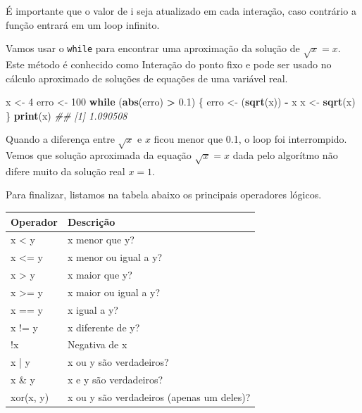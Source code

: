 \documentclass[]{book}
\newenvironment{Shaded}{\begin{snugshade}}{\end{snugshade}}
\newcommand{\CommentTok}[1]{\textcolor[rgb]{0.56,0.35,0.01}{\textit{#1}}}
\newcommand{\ControlFlowTok}[1]{\textcolor[rgb]{0.13,0.29,0.53}{\textbf{#1}}}
\newcommand{\DecValTok}[1]{\textcolor[rgb]{0.00,0.00,0.81}{#1}}
\newcommand{\FloatTok}[1]{\textcolor[rgb]{0.00,0.00,0.81}{#1}}
\newcommand{\KeywordTok}[1]{\textcolor[rgb]{0.13,0.29,0.53}{\textbf{#1}}}
\newcommand{\NormalTok}[1]{#1}
\newcommand{\OperatorTok}[1]{\textcolor[rgb]{0.81,0.36,0.00}{\textbf{#1}}}
\newcommand{\StringTok}[1]{\textcolor[rgb]{0.31,0.60,0.02}{#1}}
\begin{document}
É importante que o valor de i seja atualizado em cada interação, caso contrário a função entrará em um loop infinito.

Vamos usar o \texttt{while} para encontrar uma aproximação da solução de \(\sqrt{x} = x\). Este método é conhecido como Interação do ponto fixo e pode ser usado no cálculo aproximado de soluções de equações de uma variável real.

\begin{Shaded}
\begin{Highlighting}[]

\NormalTok{x <-}\StringTok{ }\DecValTok{4}
\NormalTok{erro <-}\StringTok{ }\DecValTok{100}
\ControlFlowTok{while}\NormalTok{ (}\KeywordTok{abs}\NormalTok{(erro) }\OperatorTok{>}\StringTok{ }\FloatTok{0.1}\NormalTok{) \{}
\NormalTok{  erro <-}\StringTok{ }\NormalTok{(}\KeywordTok{sqrt}\NormalTok{(x)) }\OperatorTok{-}\StringTok{ }\NormalTok{x}
\NormalTok{  x <-}\StringTok{ }\KeywordTok{sqrt}\NormalTok{(x)}
\NormalTok{\}}
\KeywordTok{print}\NormalTok{(x)}
\CommentTok{## [1] 1.090508}
\end{Highlighting}
\end{Shaded}

Quando a diferença entre \(\sqrt{x}\) e \(x\) ficou menor que 0.1, o loop foi interrompido.
Vemos que solução aproximada da equação \(\sqrt{x} = x\) dada pelo algorítmo não difere muito da solução real \(x=1\).

Para finalizar, listamos na tabela abaixo os principais operadores lógicos.

\begin{tabular}{l|l}
\hline
Operador & Descrição\\
\hline
x < y & x menor que y?\\
\hline
x <= y & x menor ou igual a y?\\
\hline
x > y & x maior que y?\\
\hline
x >= y & x maior ou igual a y?\\
\hline
x == y & x igual a y?\\
\hline
x != y & x diferente de y?\\
\hline
!x & Negativa de x\\
\hline
x | y & x ou y são verdadeiros?\\
\hline
x \& y & x e y são verdadeiros?\\
\hline
xor(x, y) & x ou y são verdadeiros (apenas um deles)?\\
\hline
\end{tabular}
\end{document}
